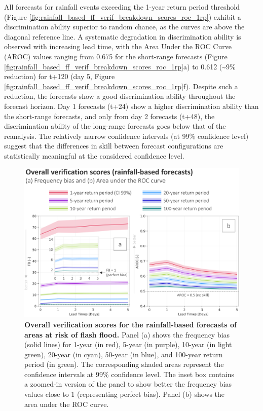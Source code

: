 All  forecasts for rainfall events exceeding the 1-year return period threshold (Figure \ref{fig:rainfall_based_ff_verif_breakdown_scores_roc_1rp}) exhibit a discrimination ability superior to random chance, as the curves are above the diagonal reference line. A systematic degradation in discrimination ability is observed with increasing lead time, with the Area Under the ROC Curve (AROC) values ranging from 0.675 for the short-range forecasts (Figure \ref{fig:rainfall_based_ff_verif_breakdown_scores_roc_1rp}a) to 0.612 (\sim9\% reduction) for t+120 (day 5, Figure \ref{fig:rainfall_based_ff_verif_breakdown_scores_roc_1rp}f). Despite such a reduction, the forecasts show a good discrimination ability throughout the forecast horizon. Day 1 forecasts (t+24) show a higher discrimination ability than the short-range forecasts, and only from day 2 forecasts (t+48), the discrimination ability of the long-range forecasts goes below that of the reanalysis. The relatively narrow confidence intervals (at 99\% confidence level) suggest that the differences in skill between forecast configurations are statistically meaningful at the considered confidence level.

\begin{figure}[htbp]
\centering
\includegraphics[width=\textwidth]{chapter_05/figures/rainfall_based_ff_verif_overall_scores.png}
\caption{\textbf{Overall verification scores for the rainfall-based forecasts of areas at risk of flash flood.} Panel (a) shows the frequency bias (solid lines) for 1-year (in red), 5-year (in purple), 10-year (in light green), 20-year (in cyan), 50-year (in blue), and 100-year return period (in green). The corresponding shaded areas represent the confidence intervals at 99\% confidence level. The inset box contains a zoomed-in version of the panel to show better the frequency bias values close to 1 (representing perfect bias). Panel (b) shows the area under the ROC curve.}
\label{fig:rainfall_based_ff_verif_overall_scores}
\end{figure}





